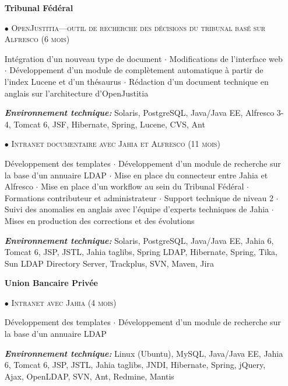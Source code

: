 \documentclass[10pt,a4paper]{moderncv}
\begin{document}
\vspace{1cm}

\begin{itemize}
		
	\item[] \textbf{Tribunal Fédéral}
	
	\item[$\bullet$] \textsc{OpenJustitia---outil de recherche des décisions du tribunal basé sur Alfresco (6 mois)}
	\item[] Intégration d'un nouveau type de document $\cdot$ Modifications de l'interface web $\cdot$ Développement d'un module de complètement automatique à partir de l'index Lucene et d'un thésaurus $\cdot$ Rédaction d'un document technique en anglais sur l'architecture d'OpenJustitia 	
	\item[] \emph{\textbf{Environnement technique:}} Solaris, PostgreSQL, Java/Java EE, Alfresco 3-4, Tomcat 6, JSF, Hibernate, Spring, Lucene, CVS, Ant
	      	      	      	
	\item[$\bullet$] \textsc{Intranet documentaire avec Jahia et Alfresco (11 mois)}
	\item[] Développement des templates $\cdot$ Développement d'un module de recherche sur la base d'un annuaire LDAP $\cdot$ Mise en place du connecteur entre Jahia et Alfresco $\cdot$ Mise en place d'un workflow au sein du Tribunal Fédéral $\cdot$ Formations contributeur et administrateur $\cdot$ Support technique de niveau 2 $\cdot$ Suivi des anomalies en anglais avec l'équipe d'experts techniques de Jahia $\cdot$ Mises en production des corrections et des évolutions
	\item[] \emph{\textbf{Environnement technique:}} Solaris, PostgreSQL, Java/Java EE, Jahia 6, Tomcat 6, JSP, JSTL, Jahia taglibs, Spring LDAP, Hibernate, Spring, Tika, Sun LDAP Directory Server, Trackplus, SVN, Maven, Jira
	      	      	      	
	\item[] \textbf{Union Bancaire Privée}
	
	\item[$\bullet$] \textsc{Intranet avec Jahia (4 mois)}
	\item[] Développement des templates $\cdot$ Développement d'un module de recherche sur la base d'un annuaire LDAP
	\item[] \emph{\textbf{Environnement technique:}} Linux (Ubuntu), MySQL, Java/Java EE, Jahia 6, Tomcat 6, JSP, JSTL, Jahia taglibs, JNDI, Hibernate, Spring, jQuery, Ajax, OpenLDAP, SVN, Ant, Redmine, Mantis
	      	      	      	

\end{itemize}
\end{document}
